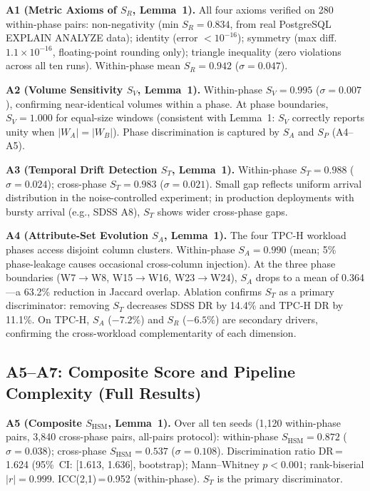 \documentclass[10pt,twocolumn,a4paper]{article}
\newcommand{\SHSM}{S_{\mathrm{HSM}}}
\newcommand{\SR}{S_{R}}
\newcommand{\SV}{S_{V}}
\newcommand{\ST}{S_{T}}
\newcommand{\SA}{S_{A}}
\newcommand{\SPER}{S_{P}}
\begin{document}
\textbf{A1 (Metric Axioms of $\SR$, Lemma~1).} All four axioms verified on
280 within-phase pairs: non-negativity (min $\SR\!=\!0.834$, from real
PostgreSQL EXPLAIN ANALYZE data); identity (error $<10^{-16}$); symmetry
(max diff.\ $1.1\times10^{-16}$, floating-point rounding only); triangle
inequality (zero violations across all ten runs). Within-phase mean
$\SR\!=\!0.942$ ($\sigma\!=\!0.047$).

\textbf{A2 (Volume Sensitivity $\SV$, Lemma~1).} Within-phase $\SV\!=\!0.995$
($\sigma\!=\!0.007$), confirming near-identical volumes within a phase.
At phase boundaries, $\SV\!=\!1.000$ for equal-size windows (consistent
with Lemma~1: $\SV$ correctly reports unity when $|W_A|\!=\!|W_B|$). Phase
discrimination is captured by $\SA$ and $\SPER$ (A4--A5).

\textbf{A3 (Temporal Drift Detection $\ST$, Lemma~1).} Within-phase
$\ST\!=\!0.988$ ($\sigma\!=\!0.024$); cross-phase $\ST\!=\!0.983$
($\sigma\!=\!0.021$). Small gap reflects uniform arrival distribution in
the noise-controlled experiment; in production deployments with bursty
arrival (e.g., SDSS A8), $\ST$ shows wider cross-phase gaps.

\textbf{A4 (Attribute-Set Evolution $\SA$, Lemma~1).} The four TPC-H workload
phases access disjoint column clusters. Within-phase $\SA\!=\!0.990$
(mean; 5\% phase-leakage causes occasional cross-column injection). At
the three phase boundaries (W7$\to$W8, W15$\to$W16, W23$\to$W24), $\SA$
drops to a mean of 0.364---a 63.2\% reduction in Jaccard overlap.
Ablation confirms $\ST$ as a primary
discriminator: removing $\ST$ decreases SDSS DR by 14.4\%
and TPC-H DR by 11.1\%.
On TPC-H, $\SA$ ($-7.2\%$) and $\SR$ ($-6.5\%$) are secondary drivers,
confirming the cross-workload complementarity of each dimension.

\subsection{A5--A7: Composite Score and Pipeline Complexity (Full Results)}

\textbf{A5 (Composite $\SHSM$, Lemma~1).} Over all ten seeds (1{,}120 within-phase
pairs, 3{,}840 cross-phase pairs, all-pairs protocol):
within-phase $\SHSM\!=\!0.872$ ($\sigma\!=\!0.038$);
cross-phase $\SHSM\!=\!0.537$ ($\sigma\!=\!0.108$).
Discrimination ratio DR\,=\,1.624 (95\%~CI: [1.613, 1.636], bootstrap);
Mann--Whitney $p\!<\!0.001$; rank-biserial $|r|\!=\!0.999$.
ICC(2,1)\,=\,0.952 (within-phase). $\ST$ is the primary discriminator.
\end{document}
